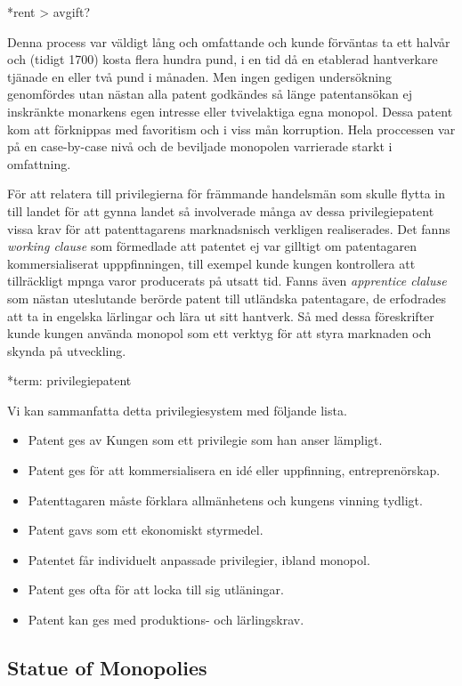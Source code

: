 *rent > avgift?

Denna process var väldigt lång och omfattande och kunde
förväntas ta ett halvår och (tidigt 1700) kosta flera hundra pund, i en tid då en etablerad hantverkare tjänade en eller två pund i månaden. \cite{macleod}
Men ingen gedigen undersökning genomfördes utan nästan alla patent godkändes så
länge patentansökan ej inskränkte monarkens egen intresse eller tvivelaktiga egna monopol. 
Dessa patent kom att förknippas med favoritism och i viss mån korruption. Hela proccessen var på en
case-by-case nivå och de beviljade monopolen varrierade starkt i omfattning\cite{bracha}.

För att relatera till privilegierna för främmande handelsmän som skulle flytta in till landet för att
gynna landet så involverade många av dessa privilegiepatent vissa krav för att patenttagarens marknadsnisch verkligen realiserades. Det fanns \emph{working clause} som förmedlade att patentet ej var
gilltigt om patentagaren kommersialiserat upppfinningen, till exempel kunde kungen kontrollera att
tillräckligt mpnga varor producerats på utsatt tid. Fanns även \emph{apprentice claluse} som nästan
uteslutande berörde patent till utländska patentagare, de erfodrades att ta in engelska lärlingar och
lära ut sitt hantverk. Så med dessa föreskrifter kunde kungen använda monopol som ett verktyg för att styra marknaden och skynda på utveckling.\cite{bracha}

*term: privilegiepatent

Vi kan sammanfatta detta privilegiesystem med följande lista.
\begin{itemize}
	\item Patent ges av Kungen som ett privilegie som han anser lämpligt.
	\item Patent ges för att kommersialisera en idé eller uppfinning, entreprenörskap.
	\item Patenttagaren måste förklara allmänhetens och kungens vinning tydligt.
	\item Patent gavs som ett ekonomiskt styrmedel.
	\item Patentet får individuelt anpassade privilegier, ibland monopol.
	\item Patent ges ofta för att locka till sig utläningar.
	\item Patent kan ges med produktions- och lärlingskrav.
\end{itemize}


\subsection{Statue of Monopolies} 
\label{sub:statue_of_monopolies}


